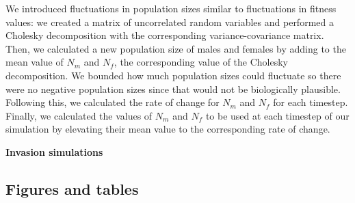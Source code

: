 \documentclass[]{article}
\begin{document}
We introduced fluctuations in population sizes similar to fluctuations in fitness values: we created a matrix of uncorrelated random variables and performed a Cholesky decomposition with the corresponding variance-covariance matrix. Then, we calculated a new population size of males and females by adding to the mean value of $N_{m}$ and $N_{f}$, the corresponding value of the Cholesky decomposition. We bounded how much population sizes could fluctuate so there were no negative population sizes since that would not be biologically plausible. Following this, we calculated the rate of change for $N_{m}$ and $N_{f}$ for each timestep. Finally, we calculated the values of $N_{m}$ and $N_{f}$ to be used at each timestep of our simulation by elevating their mean value to the corresponding rate of change.

\vspace{5mm}
\noindent\textbf{Invasion simulations}



\clearpage
\subsection*{Figures and tables }
\end{document}
